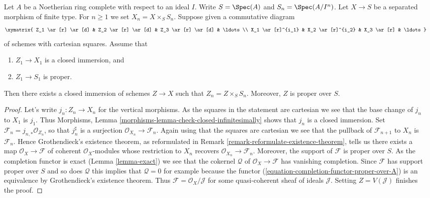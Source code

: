 \begin{lemma}
\label{lemma-algebraize-formal-closed-subscheme}
Let $A$ be a Noetherian ring complete with respect to an ideal $I$.
Write $S = \Spec(A)$ and $S_n = \Spec(A/I^n)$.
Let $X \to S$ be a separated morphism of finite type.
For $n \geq 1$ we set $X_n = X \times_S S_n$.
Suppose given a commutative diagram
$$
\xymatrix{
Z_1 \ar[r] \ar[d] & Z_2 \ar[r] \ar[d] & Z_3 \ar[r] \ar[d] & \ldots \\
X_1 \ar[r]^{i_1} & X_2 \ar[r]^{i_2} & X_3 \ar[r] & \ldots
}
$$
of schemes with cartesian squares. Assume that
\begin{enumerate}
\item $Z_1 \to X_1$ is a closed immersion, and
\item $Z_1 \to S_1$ is proper.
\end{enumerate}
Then there exists a closed immersion of schemes $Z \to X$ such that
$Z_n = Z \times_S S_n$. Moreover, $Z$ is proper over $S$.
\end{lemma}

\begin{proof}
Let's write $j_n : Z_n \to X_n$ for the vertical morphisms.
As the squares in the statement are cartesian
we see that the base change of $j_n$ to $X_1$ is $j_1$.
Thus Morphisms, Lemma \ref{morphisms-lemma-check-closed-infinitesimally}
shows that $j_n$ is a closed immersion.
Set $\mathcal{F}_n = j_{n, *}\mathcal{O}_{Z_n}$, so that
$j_n^\sharp$ is a surjection $\mathcal{O}_{X_n} \to \mathcal{F}_n$.
Again using that the squares are cartesian we see that
the pullback of $\mathcal{F}_{n + 1}$ to $X_n$ is $\mathcal{F}_n$.
Hence Grothendieck's existence theorem, as reformulated in
Remark \ref{remark-reformulate-existence-theorem},
tells us there exists a map
$\mathcal{O}_X \to \mathcal{F}$
of coherent $\mathcal{O}_X$-modules whose restriction to
$X_n$ recovers $\mathcal{O}_{X_n} \to \mathcal{F}_n$.
Moreover, the support of $\mathcal{F}$ is proper over $S$.
As the completion functor is exact (Lemma \ref{lemma-exact})
we see that the cokernel $\mathcal{Q}$ of $\mathcal{O}_X \to \mathcal{F}$
has vanishing completion. Since $\mathcal{F}$ has support
proper over $S$ and so does $\mathcal{Q}$ this implies that
$\mathcal{Q} = 0$ for example because the functor
(\ref{equation-completion-functor-proper-over-A}) is an equivalence
by Grothendieck's existence theorem.
Thus $\mathcal{F} = \mathcal{O}_X/\mathcal{J}$
for some quasi-coherent sheaf of ideals $\mathcal{J}$.
Setting $Z = V(\mathcal{J})$ finishes the proof.
\end{proof}

